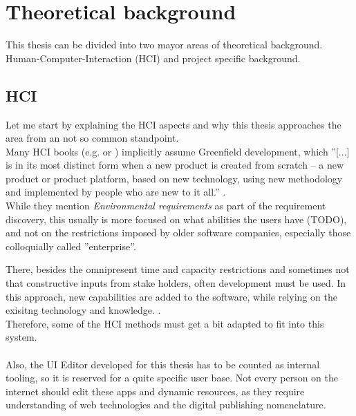 %
\chapter{Theoretical background}

This thesis can be divided into two mayor areas of theoretical background.
Human-Computer-Interaction (HCI) and project specific background.

\section{HCI}
Let me start by explaining the HCI aspects and why this thesis approaches the area from an not so common standpoint.
\\
Many HCI books (e.g. \cite{Interactiondesign:2019ys} or \cite{LearnHCI:2020ys}) implicitly assume \label{def:Greenfield} Greenfield development,
which ''[...] is in its most distinct form when a new product is created from scratch – a new product or product platform, based on new technology, using new methodology and implemented by people who are new to it all.'' \cite{BrownfieldToGreenfield:2021ys}.
\\
While they mention \textit{Environmental requirements} as part of the requirement discovery, this usually is more focused on what abilities the users have (TODO), and not on the restrictions imposed by older software companies, especially those colloquially called ''enterprise''.

There, besides the omnipresent time and capacity restrictions and sometimes not that constructive inputs from stake holders, often \label{def:Brownfield} development must be used.
In this approach, new capabilities are added to the software, while relying on the exisitng technology and knowledge. \cite{BrownfieldToGreenfield:2021ys}.
\\
Therefore, some of the HCI methods must get a bit adapted to fit into this system.
\\\\
Also, the UI Editor developed for this thesis has to be counted as internal tooling, so it is reserved for a quite specific user base.
Not every person on the internet should edit these apps and dynamic resources, as they require understanding of web technologies and the digital publishing nomenclature.

